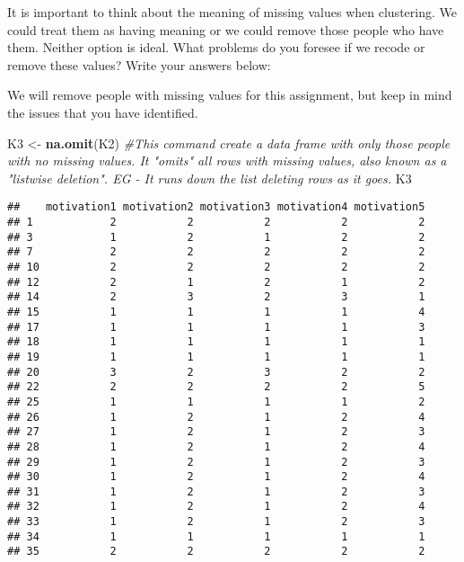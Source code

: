 \documentclass[]{article}
\newenvironment{Shaded}{\begin{snugshade}}{\end{snugshade}}
\newcommand{\CommentTok}[1]{\textcolor[rgb]{0.56,0.35,0.01}{\textit{#1}}}
\newcommand{\KeywordTok}[1]{\textcolor[rgb]{0.13,0.29,0.53}{\textbf{#1}}}
\newcommand{\NormalTok}[1]{#1}
\newcommand{\StringTok}[1]{\textcolor[rgb]{0.31,0.60,0.02}{#1}}
\begin{document}
It is important to think about the meaning of missing values when
clustering. We could treat them as having meaning or we could remove
those people who have them. Neither option is ideal. What problems do
you foresee if we recode or remove these values? Write your answers
below:

We will remove people with missing values for this assignment, but keep
in mind the issues that you have identified.

\begin{Shaded}
\begin{Highlighting}[]
\NormalTok{K3 <-}\StringTok{ }\KeywordTok{na.omit}\NormalTok{(K2) }\CommentTok{#This command create a data frame with only those people with no missing values. It "omits" all rows with missing values, also known as a "listwise deletion". EG - It runs down the list deleting rows as it goes.}
\NormalTok{K3}
\end{Highlighting}
\end{Shaded}

\begin{verbatim}
##    motivation1 motivation2 motivation3 motivation4 motivation5
## 1            2           2           2           2           2
## 3            1           2           1           2           2
## 7            2           2           2           2           2
## 10           2           2           2           2           2
## 12           2           1           2           1           2
## 14           2           3           2           3           1
## 15           1           1           1           1           4
## 17           1           1           1           1           3
## 18           1           1           1           1           1
## 19           1           1           1           1           1
## 20           3           2           3           2           2
## 22           2           2           2           2           5
## 25           1           1           1           1           2
## 26           1           2           1           2           4
## 27           1           2           1           2           3
## 28           1           2           1           2           4
## 29           1           2           1           2           3
## 30           1           2           1           2           4
## 31           1           2           1           2           3
## 32           1           2           1           2           4
## 33           1           2           1           2           3
## 34           1           1           1           1           1
## 35           2           2           2           2           2
\end{verbatim}
\end{document}
